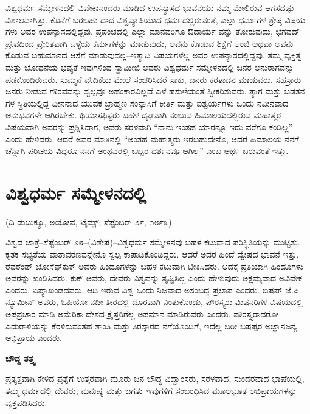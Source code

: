 ವಿಶ್ವಧರ್ಮ ಸಮ್ಮೇಳನದಲ್ಲಿ ವಿವೇಕಾನಂದರು ಮಾಡಿದ ಉಪನ್ಯಾಸದ ಭಾವನೆಯು ನಮ್ಮ ಮೇಲಿರುವ ಆಗಸದಷ್ಟು ವಿಶಾಲವಾಗಿತ್ತು. ಕೊನೆಗೆ ಬರಬಹು ದಾದ ವಿಶ್ವವ್ಯಾಪಿಯಾದ ಧರ್ಮದಲ್ಲಿರುವಂತೆ, ಎಲ್ಲಾ ಧರ್ಮಗಳ ಶ್ರೇಷ್ಠ ವಿಷಯ ಗಳು ಅವರ ಉಪನ್ಯಾಸದಲ್ಲಿದ್ದವು. ಪ್ರಪಂಚದಲ್ಲಿ ಎಲ್ಲಾ ಮಾನವರಿಗೂ ಔದಾರ್ಯ ವನ್ನು ತೋರುವುದು, ಭಗವದ್​ ಪ್ರೇವದಿಂದ ಪ್ರೇರಿತವಾಗಿ ಒಳ್ಳೆಯ ಕರ್ಮಗಳನ್ನು ಮಾಡುವುದು, ಅವನು ಕೊಡುವ ಶಿಕ್ಷೆಗೆ ಅಂಜಿ ಅಥವಾ ಅವನು ಕೊಡುವ ಬಹುಮಾನದ ಆಸೆಗೆ ಮಾಡುವುದಲ್ಲ–ಇತ್ಯಾದಿ ವಿಷಯಗಳೆಲ್ಲ ಅವರ ಉಪನ್ಯಾಸದಲ್ಲಿದ್ದವು. ತಮ್ಮ ವ್ಯಕ್ತಿತ್ವ ಮತ್ತು ಬೋಧನೆಯ ಭವ್ಯತೆ ಇವುಗಳಿಂದ ಸ್ವಾಮೀಜಿ ಅವರು ವಿಶ್ವಧರ್ಮ ಸಮ್ಮೇಳನದಲ್ಲಿ ಜನರ ಅನುರಾಗವನ್ನು ಪಡಕೊಂಡಿರುವರು. ಸುಮ್ಮನೆ ವೇದಿಕೆಯ ಮೇಲೆ ಸಂಚರಿಸಿದರೆ ಸಾಕು, ಜನರು ಕರತಾಡನ ಮಾಡುವರು. ಸಹಸ್ರಾರು ಜನರು ನೀಡುವ ಗೌರವವನ್ನು ಸ್ವಲ್ಪವೂ ಅಹಂಕಾರವಿಲ್ಲದೆ ಎಳೆ ಹಸುಳೆಯಂತೆ ಸ್ವೀಕರಿಸುವರು. ತ್ಯಾಗ ಮತ್ತು ಬಡತನ ಗಳ ಸ್ಥಿತಿಯಲ್ಲಿದ್ದ ದೀನನಾದ ಯುವಕ ಬ್ರಾಹ್ಮಣ ಸಂನ್ಯಾಸಿಗೆ ಕೀರ್ತಿ ಮತ್ತು ಐಶ್ವರ್ಯಗಳು ಒಂದು ನವೀನವಾದ ಅನುಭವಗಳೇ ಆಗಿರಬೇಕು. ಥಿಯಾಸಫಿಸ್ಟರು ಬಹಳ ದೃಢವಾಗಿ ನಂಬುವ ಹಿಮಾಲಯದಲ್ಲಿರುವ ಮಹಾತ್ಮರ ವಿಷಯವಾಗಿ ಅವರನ್ನು ಪ್ರಶ್ನಿಸಿದಾಗ, ಅವರು ಸರಳವಾಗಿ “ನಾನು ಇಂತಹ ಯಾರನ್ನೂ ಇದು ವರೆಗೂ ಕಂಡಿಲ್ಲ” ಎಂದು ಹೇಳಿದರು. ಆದರೆ ಅವರ ಮಾತಿನಲ್ಲಿ “ಅಂತಹ ಮಹಾತ್ಮರು ಇರಬಹುದೇನೊ, ಆದರೆ ಹಿಮಾಲಯ ನನಗೆ ಚೆನ್ನಾಗಿ ಪರಿಚಯ ವಿದ್ದರೂ ನನಗೆ ಅಂಥವರಲ್ಲಿ ಒಬ್ಬರ ದರ್ಶನವೂ ಆಗಿಲ್ಲ” ಎಂಬ ಅರ್ಥ ಬರುವಂತೆ ಇತ್ತು.


\section{ವಿಶ್ವಧರ್ಮ ಸಮ್ಮೇಳನದಲ್ಲಿ}

\begin{center}
(ದಿ ಡುಬುಕ್ಯೂ, ಅಯೋವ, ಟೈಮ್ಸ್​, ಸೆಪ್ಟೆಂಬರ್​ ೨೯, ೧೮೯೩)
\end{center}

ವಿಶ್ವದ ಜಾತ್ರೆ–ಸೆಪ್ಟೆಂಬರ್​ ೨೮–(ವಿಶೇಷ)–ವಿಶ್ವಧರ್ಮ ಸಮ್ಮೇಳನವು ಬಹಳ ಕಟುವಾದ ಪರಿಸ್ಥಿತಿಯನ್ನು ಮುಟ್ಟಿತು. ಕೃತಕ ಸಭ್ಯತೆಯ ವಾತಾವರಣವನ್ನೇನೊ ಸ್ವಲ್ಪ ಕಾಪಾಡಿಕೊಂಡಿದ್ದರು. ಆದರೆ ಅದರ ಹಿಂದೆ ದ್ವೇಷದ ಭಾವನೆ ಇತ್ತು. ರೆವರೆಂಡ್​ ಜೋಸೆಫ್​ಕುಕ್​ ಅವರು ಹಿಂದೂಗಳನ್ನು ಬಹಳ ಕಟುವಾಗಿ ಟೀಕಿಸಿದರು. ಅದಕ್ಕೆ ಪ್ರತಿಯಾಗಿ ಹಿಂದೂಗಳು ಅವರನ್ನು ಖಂಡಿಸಿದರು. ಕುಕ್​ ಅವರು, ದೇವರು ವಿಶ್ವವನ್ನು ಸೃಷ್ಟಿಸಿಲ್ಲ ಎಂದು ಹೇಳುವುದು ಅಕ್ಷಮ್ಯವಾದ ಅವಿವೇಕ ಎಂದರು. ಏಷ್ಯಾಖಂಡದವರು, ಆದಿ ಇರುವ ವಿಶ್ವ ಒಂದು ನಿಜವಾದ ಅಸಂಬದ್ಧ ಪ್ರಲಾಪ ಎಂದರು. ಬಿಷಪ್​ ಜೆ.ಪಿ. ನ್ಯೂಮೀನ್​ ಅವರು, ಓಹಿಯೋ ನದೀ ತೀರದಲ್ಲಿ ದೂರವಾಗಿ ನಿಂತುಕೊಂಡು, ಪೌರಸ್ತ್ಯರು ಮಿಷನರಿಗಳ ವಿಷಯದಲ್ಲಿ ಅಪಪ್ರಚಾರ ಮಾಡಿ ಅಮೆರಿಕಾ ದೇಶದ ಕ್ರೈಸ್ತರಿಗೆಲ್ಲ ಅಪಮಾನ ಮಾಡಿರುವರು ಎಂದರು. ಪೌರಸ್ತ್ಯರಾದರೋ ಎದುರಾಳಿಯನ್ನು ಕೆರಳಿಸುವಂತಹ ಶಾಂತಿ ಮತ್ತು ತಿರಸ್ಕಾರದ ನಗೆಯೊಂದಿಗೆ, ಇದೆಲ್ಲ ಬರೀ ಬಿಷಪ್ಪರ ಅಜ್ಞಾನಜನ್ಯ ಅಭಿಪ್ರಾಯ ಎಂದರು.

\begin{center}
\textbf{ಬೌದ್ಧ ತತ್ತ್ವ}
\end{center}

ಪ್ರತ್ಯಕ್ಷವಾಗಿ ಕೇಳಿದ ಪ್ರಶ್ನೆಗೆ ಉತ್ತರವಾಗಿ ಮೂರು ಜನ ಬೌದ್ಧ ವಿದ್ವಾಂಸರು, ಸರಳವಾದ, ಸುಂದರವಾದ ಭಾಷೆಯಲ್ಲಿ, ತಮ್ಮ ಧರ್ಮದಲ್ಲಿ ದೇವರು, ಮನುಷ್ಯ ಮತ್ತು ಜಗತ್ತು ಇವುಗಳಿಗೆ ಸಂಬಂಧಿಸಿದ ಮೂಲಭೂತ ಅಭಿಪ್ರಾಯಗಳನ್ನು ವ್ಯಕ್ತಪಡಿಸಿದರು.

